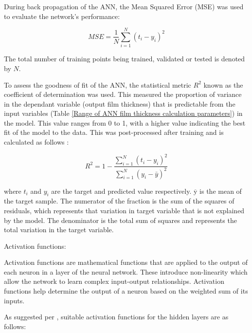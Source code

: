 During back propagation of the ANN, the Mean Squared Error (MSE) was used to evaluate the network's performance:

\begin{equation}\label{MSE}
	M S E=\frac{1}{N} \sum_{i=1}^N\left(t_i-y_i\right)^2
\end{equation}

The total number of training points being trained, validated or tested is denoted by $N$. 

To assess the goodness of fit of the ANN, the statistical metric $R^2$ known as the coefficient of determination was used. This measured the proportion of variance in the dependant variable (output film thickness) that is predictable from the input variables (Table \ref{Range of ANN film thickness calculation parameters}) in the model. This value ranges from 0 to 1, with a higher value indicating the best fit of the model to the data. This was post-processed after training and is calculated as follows \cite{Marian2022}:

\begin{equation}\label{R-squared}
	R^2=1-\frac{\sum_{i=1}^N\left(t_i-y_i\right)^2}{\sum_{i=1}^N\left(y_i-\bar{y}\right)^2}
\end{equation}

where $t_i$ and $y_i$ are the target and predicted value respectively. $\overline{\mathrm{y}}$ is the mean of the target sample. The numerator of the fraction is the sum of the squares of residuals, which represents that variation in target variable that is not explained by the model. The denominator is the total sum of squares and represents the total variation in the target variable. 

Activation functions:

Activation functions are mathematical functions that are applied to the output of each neuron in a layer of the neural network. These introduce non-linearity which allow the network to learn complex input-output relationships. Activation functions help determine the  output of a neuron based on the weighted sum of its inputs.

As suggested per \cite{Marian2022}, suitable activation functions for the hidden layers are as follows:

